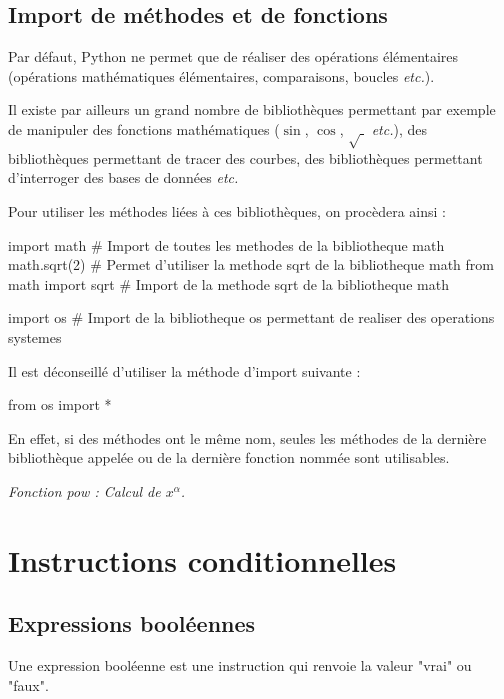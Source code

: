 \documentclass[10pt]{article}
\begin{document}
\subsection{Import de méthodes et de fonctions}

Par défaut, Python ne permet que de réaliser des opérations élémentaires (opérations mathématiques élémentaires, comparaisons, boucles \textit{etc.}). 

Il existe par ailleurs un grand nombre de bibliothèques permettant par exemple de manipuler des fonctions mathématiques ($\sin$, $\cos$, $\sqrt{\;}$ \textit{etc.}), des bibliothèques permettant de tracer des courbes, des bibliothèques permettant d'interroger des bases de données \textit{etc.}

 

Pour utiliser les méthodes liées à ces bibliothèques, on procèdera ainsi :

\begin{py}
\begin{python}
import math  # Import de toutes les methodes de la bibliotheque math
math.sqrt(2) # Permet d'utiliser la methode sqrt de la bibliotheque math
from math import sqrt # Import de la methode sqrt de la bibliotheque math

import os # Import de la bibliotheque os permettant de realiser des operations systemes
\end{python}
\end{py} 

\begin{warn}
Il est déconseillé d'utiliser la méthode d'import suivante : 
\begin{python}
from os import *
\end{python}

En effet, si des méthodes ont le même nom, seules les méthodes de la dernière bibliothèque appelée ou de la dernière fonction nommée sont utilisables. 
\end{warn}


\begin{exemple}
\textit{Fonction pow : Calcul de $x^\alpha$.}

\end{exemple}
\section{Instructions conditionnelles}



\subsection{Expressions booléennes}
\begin{defi}
Une expression booléenne est une instruction qui renvoie la valeur "vrai" ou "faux".
\end{defi}
\end{document}

